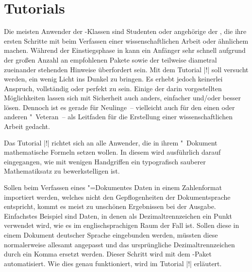 \chapter{%
  Tutorials%
  \label{sec:tut}%
}
Die meisten Anwender der \TUDScript-Klassen sind Studenten oder angehörige der 
\TnUD, die ihre ersten Schritte mit  beim Verfassen einer 
wissenschaftlichen Arbeit oder ähnlichem machen. Während der Einstiegsphase in 
 kann ein Anfänger sehr schnell aufgrund der großen Anzahl an 
empfohlenen Pakete sowie der teilweise diametral zueinander stehenden Hinweise 
überfordert sein. Mit dem Tutorial |!| soll versucht werden, 
ein wenig Licht ins Dunkel zu bringen. Es erhebt jedoch keinerlei Anspruch, 
vollständig oder perfekt zu sein. Einige der darin vorgestellten Möglichkeiten 
lassen sich mit Sicherheit auch anders, einfacher und/oder besser lösen. 
Dennoch ist es gerade für Neulinge~-- vielleicht auch für den einen oder 
anderen "~Veteran~-- als Leitfaden für die Erstellung einer 
wissenschaftlichen Arbeit gedacht.

Das Tutorial |!| richtet sich an alle Anwender, die in ihrem 
"~Dokument mathematische Formeln setzen wollen. In diesem wird 
ausführlich darauf eingegangen, wie mit wenigen Handgriffen ein typografisch 
sauberer Mathematiksatz zu bewerkstelligen ist.

Sollen beim Verfassen eines "=Dokumentes Daten in einem 
Zahlenformat importiert werden, welches nicht den Gepflogenheiten der 
Dokumentsprache entspricht, kommt es meist zu unschönen Ergebnissen bei der 
Ausgabe. Einfachstes Beispiel sind Daten, in denen als Dezimaltrennzeichen ein 
Punkt verwendet wird, wie es im englischsprachigen Raum der Fall ist. Sollen 
diese in einem Dokument deutscher Sprache eingebunden werden, müssten diese 
normalerweise allesamt angepasst und das ursprüngliche Dezimaltrennzeichen 
durch ein Komma ersetzt werden. Dieser Schritt wird mit dem \TUDScript-Paket 
 automatisiert. Wie dies genau funktioniert, wird im Tutorial 
|!| erläutert.%
%
